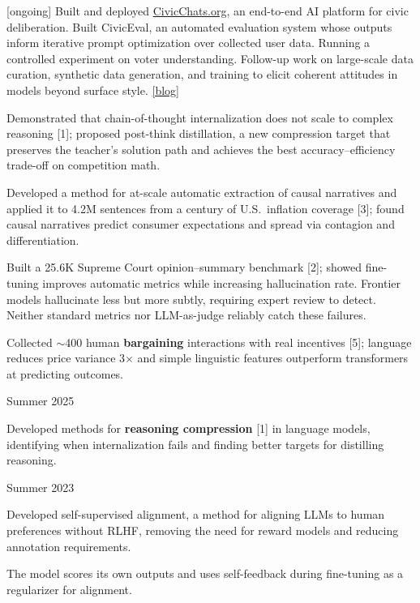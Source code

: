 \documentclass[11pt,letterpaper]{article}
\begin{document}
\begin{cvitems}
    \item {[ongoing]} Built and deployed \href{https://civicchats.org}{CivicChats.org}, an end-to-end AI platform for civic deliberation. Built CivicEval, an automated evaluation system whose outputs inform iterative prompt optimization over collected user data. Running a controlled experiment on voter understanding. Follow-up work on large-scale data curation, synthetic data generation, and training to elicit coherent attitudes in models beyond surface style. \href{https://open.substack.com/pub/cichicago/p/civicchats-building-ai-to-support}{[blog]}
    \item Demonstrated that chain-of-thought internalization does not scale to complex reasoning [1]; proposed post-think distillation, a new compression target that preserves the teacher's solution path and achieves the best accuracy--efficiency trade-off on competition math.
    \item Developed a method for at-scale automatic extraction of causal narratives and applied it to 4.2M sentences from a century of U.S.\ inflation coverage [3]; found causal narratives predict consumer expectations and spread via contagion and differentiation.
    \item Built a 25.6K Supreme Court opinion--summary benchmark [2]; showed fine-tuning improves automatic metrics while increasing hallucination rate. Frontier models hallucinate less but more subtly, requiring expert review to detect. Neither standard metrics nor LLM-as-judge reliably catch these failures.
    \item Collected $\sim$400 human \textbf{bargaining} interactions with real incentives [5]; language reduces price variance 3$\times$ and simple linguistic features outperform transformers at predicting outcomes.
\end{cvitems}

\vspace{4pt}
 \hfill Summer 2025
\begin{cvitems}
    \item Developed methods for \textbf{reasoning compression} [1] in language models, identifying when internalization fails and finding better targets for distilling reasoning.
\end{cvitems}

\vspace{4pt}
 \hfill Summer 2023
\begin{cvitems}
    \item Developed self-supervised alignment, a method for aligning LLMs to human preferences without RLHF, removing the need for reward models and reducing annotation requirements.
    \item The model scores its own outputs and uses self-feedback during fine-tuning as a regularizer for alignment.
\end{cvitems}
\end{document}

